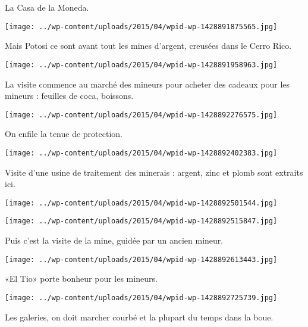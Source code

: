  \newline
 La Casa de la Moneda.  \newline
 \newline
\centerline{\texttt{[image: ../wp-content/uploads/2015/04/wpid-wp-1428891875565.jpg]} } 
 \newline
 Mais Potosi ce sont avant tout les mines d'argent, creusées dans le Cerro Rico. \newline
 \newline
\centerline{\texttt{[image: ../wp-content/uploads/2015/04/wpid-wp-1428891958963.jpg]} } 
 \newline
 La visite commence au marché des mineurs pour acheter des cadeaux pour les mineurs : feuilles de coca, boissons. \newline
 \newline
\centerline{\texttt{[image: ../wp-content/uploads/2015/04/wpid-wp-1428892276575.jpg]} } 
 \newline
 On enfile la tenue de protection.  \newline
 \newline
\centerline{\texttt{[image: ../wp-content/uploads/2015/04/wpid-wp-1428892402383.jpg]} } 
 \newline
 Visite d'une usine de traitement des minerais : argent, zinc et plomb sont extraits ici.  \newline
 \newline
\centerline{\texttt{[image: ../wp-content/uploads/2015/04/wpid-wp-1428892501544.jpg]} } 
 \newline
 \newline
\centerline{\texttt{[image: ../wp-content/uploads/2015/04/wpid-wp-1428892515847.jpg]} } 
 \newline
 Puis c'est la visite de la mine, guidée par un ancien mineur.  \newline
 \newline
\centerline{\texttt{[image: ../wp-content/uploads/2015/04/wpid-wp-1428892613443.jpg]} } 
 \newline
 «El Tio» porte bonheur pour les mineurs.  \newline
 \newline
\centerline{\texttt{[image: ../wp-content/uploads/2015/04/wpid-wp-1428892725739.jpg]} } 
 \newline
 Les galeries, on doit marcher courbé et la plupart du temps dans la boue.  \newline
 \newline
